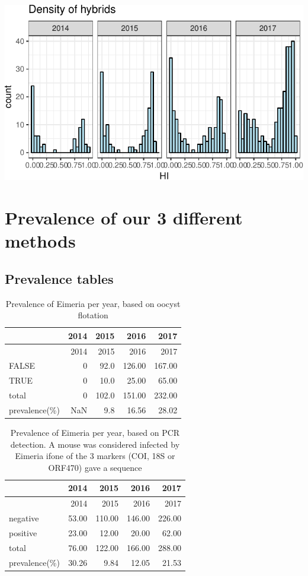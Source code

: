 \documentclass[]{article}
\let\origfigure\figure
\let\endorigfigure\endfigure
\renewenvironment{figure}[1][2] { 
    \expandafter\origfigure\expandafter[H] 
} { 
    \endorigfigure 
}
\begin{document}
\begin{figure}[htbp]
\centering
\includegraphics{Data_Analysis_Alice_files/figure-latex/plotDensHI_3.75-1.pdf}
\caption{\label{fig:plot1}Number of animals caught along the hybrid
index}
\end{figure}

\section{Prevalence of our 3 different
methods}\label{prevalence-of-our-3-different-methods-1}

\subsection{Prevalence tables}\label{prevalence-tables-1}

\begin{longtable}[]{@{}lrrrr@{}}
\caption{Prevalence of Eimeria per year, based on oocyst
flotation}\tabularnewline
\toprule
& 2014 & 2015 & 2016 & 2017\tabularnewline
\midrule
\endfirsthead
\toprule
& 2014 & 2015 & 2016 & 2017\tabularnewline
\midrule
\endhead
FALSE & 0 & 92.0 & 126.00 & 167.00\tabularnewline
TRUE & 0 & 10.0 & 25.00 & 65.00\tabularnewline
total & 0 & 102.0 & 151.00 & 232.00\tabularnewline
prevalence(\%) & NaN & 9.8 & 16.56 & 28.02\tabularnewline
\bottomrule
\end{longtable}

\begin{longtable}[]{@{}lrrrr@{}}
\caption{Prevalence of Eimeria per year, based on PCR detection. A mouse
was considered infected by Eimeria ifone of the 3 markers (COI, 18S or
ORF470) gave a sequence}\tabularnewline
\toprule
& 2014 & 2015 & 2016 & 2017\tabularnewline
\midrule
\endfirsthead
\toprule
& 2014 & 2015 & 2016 & 2017\tabularnewline
\midrule
\endhead
negative & 53.00 & 110.00 & 146.00 & 226.00\tabularnewline
positive & 23.00 & 12.00 & 20.00 & 62.00\tabularnewline
total & 76.00 & 122.00 & 166.00 & 288.00\tabularnewline
prevalence(\%) & 30.26 & 9.84 & 12.05 & 21.53\tabularnewline
\bottomrule
\end{longtable}
\end{document}
